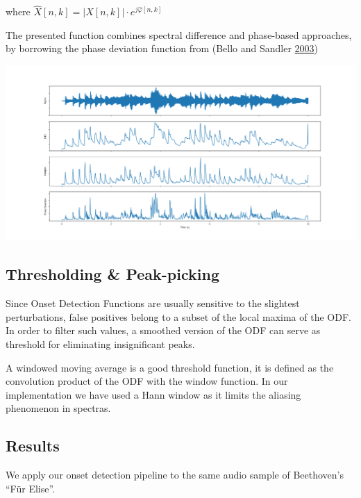 \documentclass[american,]{article}
\begin{document}
where
\(\hat{X}[n, k] = \left\lvert X[n, k]\right\rvert \cdot e^{j\hat{\varphi}[n, k]}\)

The presented function combines spectral difference and phase-based approaches,
by borrowing the phase deviation function from (Bello and Sandler \protect\hyperlink{ref-bello}{2003})

\includegraphics{img/plot/odf.png}

\hypertarget{thresholding-peak-picking}{%
\subsection{Thresholding \& Peak-picking}\label{thresholding-peak-picking}}

Since Onset Detection Functions are usually sensitive
to the slightest perturbations, false positives belong
to a subset of the local maxima of the ODF.
In order to filter such values, a smoothed version of the ODF
can serve as threshold for eliminating insignificant peaks.

A windowed moving average is a good threshold function,
it is defined as the convolution product of the ODF
with the window function.
In our implementation we have used a Hann window as it
limits the aliasing phenomenon in spectras.

\hypertarget{results}{%
\subsection{Results}\label{results}}

We apply our onset detection pipeline to the same
audio sample of Beethoven's ``Für Elise''.
\end{document}
